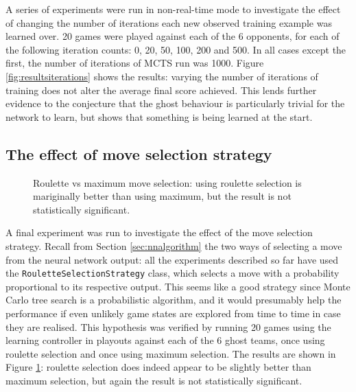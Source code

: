 A series of experiments were run in non-real-time mode to investigate the effect of changing the number of iterations each new observed training example was learned over.  20 games were played against each of the 6 opponents, for each of the following iteration counts: 0, 20, 50, 100, 200 and 500.  In all cases except the first, the number of iterations of MCTS run was 1000.  Figure \ref{fig:resultsiterations} shows the results: varying the number of iterations of training does not alter the average final score achieved.  This lends further evidence to the conjecture that the ghost behaviour is particularly trivial for the network to learn, but shows that something is being learned at the start.


\subsection{The effect of move selection strategy}

\begin{figure}
\centering
{}
\caption[Roulette vs maximum move selection]{Roulette vs maximum move selection: using roulette selection is mariginally better than using maximum, but the result is not statistically significant.}
\label{fig:resultsmax}
\end{figure}

A final experiment was run to investigate the effect of the move selection strategy.  Recall from Section \ref{sec:nnalgorithm} the two ways of selecting a move from the neural network output: all the experiments described so far have used the {\tt RouletteSelectionStrategy} class, which selects a move with a probability proportional to its respective output.  This seems like a good strategy since Monte Carlo tree search is a probabilistic algorithm, and it would presumably help the performance if even unlikely game states are explored from time to time in case they are realised.  This hypothesis was verified by running 20 games using the learning controller in playouts against each of the 6 ghost teams, once using roulette selection and once using maximum selection.  The results are shown in Figure \ref{fig:resultsmax}: roulette selection does indeed appear to be slightly better than maximum selection, but again the result is not statistically significant.

